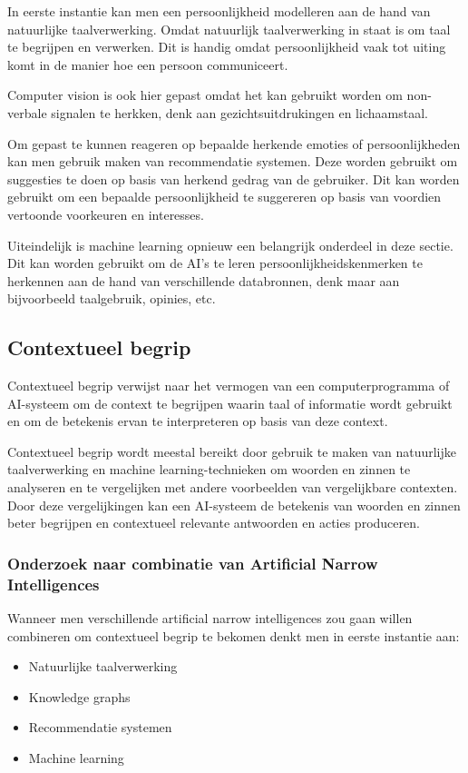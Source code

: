 In eerste instantie kan men een persoonlijkheid modelleren aan de hand van natuurlijke taalverwerking. Omdat natuurlijk taalverwerking in staat is om taal te begrijpen en verwerken. Dit is handig omdat persoonlijkheid vaak tot uiting komt in de manier hoe een persoon communiceert.

Computer vision is ook hier gepast omdat het kan gebruikt worden om non-verbale signalen te herkken, denk aan gezichtsuitdrukingen en lichaamstaal.

Om gepast te kunnen reageren op bepaalde herkende emoties of persoonlijkheden kan men gebruik maken van recommendatie systemen. Deze worden gebruikt om suggesties te doen op basis van herkend gedrag van de gebruiker. Dit kan worden gebruikt om een bepaalde persoonlijkheid te suggereren op basis van voordien vertoonde voorkeuren en interesses.

Uiteindelijk is machine learning opnieuw een belangrijk onderdeel in deze sectie. Dit kan worden gebruikt om de AI's te leren persoonlijkheidskenmerken te herkennen aan de hand van verschillende databronnen, denk maar aan bijvoorbeeld taalgebruik, opinies, etc.

\subsection{Contextueel begrip}

Contextueel begrip verwijst naar het vermogen van een computerprogramma of AI-systeem om de context te begrijpen waarin taal of informatie wordt gebruikt en om de betekenis ervan te interpreteren op basis van deze context.

Contextueel begrip wordt meestal bereikt door gebruik te maken van natuurlijke taalverwerking en machine learning-technieken om woorden en zinnen te analyseren en te vergelijken met andere voorbeelden van vergelijkbare contexten. Door deze vergelijkingen kan een AI-systeem de betekenis van woorden en zinnen beter begrijpen en contextueel relevante antwoorden en acties produceren.

\subsubsection{Onderzoek naar combinatie van Artificial Narrow Intelligences}

Wanneer men verschillende artificial narrow intelligences zou gaan willen combineren om contextueel begrip te bekomen denkt men in eerste instantie aan:

\begin{itemize}
    \item Natuurlijke taalverwerking
    \item Knowledge graphs
    \item Recommendatie systemen
    \item Machine learning
\end{itemize}

